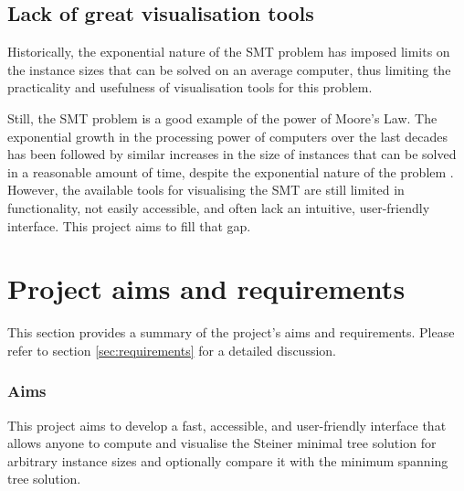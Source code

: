 \documentclass{l4proj}
\begin{document}
\subsection{Lack of great visualisation tools}
Historically, the exponential nature of the SMT problem has imposed limits on the instance sizes that can be solved on an average computer, thus limiting the practicality and usefulness of visualisation tools for this problem.

Still, the SMT problem is a good example of the power of Moore's Law. The exponential growth in the processing power of computers over the last decades has been followed by similar increases in the size of instances that can be solved in a reasonable amount of time, despite the exponential nature of the problem \citep{29ee725d11ac4584b72f7fe66c4326fa}.
However, the available tools for visualising the SMT are still limited in functionality, not easily accessible, and often lack an intuitive, user-friendly interface.
This project aims to fill that gap.





\section{Project aims and requirements}
This section provides a summary of the project's aims and requirements. Please refer to section \ref{sec:requirements} for a detailed discussion.

\subsubsection{Aims}
This project aims to develop a fast, accessible, and user-friendly interface that allows anyone to compute and visualise the Steiner minimal tree solution for arbitrary instance sizes and optionally compare it with the minimum spanning tree solution.
\end{document}
